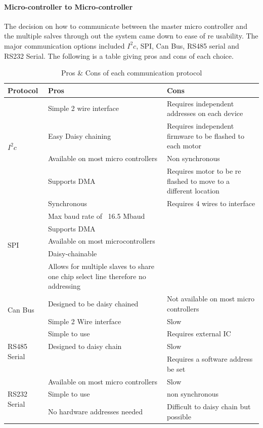             \paragraph{Micro-controller to Micro-controller}
            The decision on how to communicate between the master micro controller and the multiple salves through out the system came down to ease of re usability. The major communication options included ${I^2c}$, SPI, Can Bus, RS485 serial and RS232 Serial. The following is a table giving pros and cons of each choice.
        \begin{table}[H]
            \centering
            \begin{tabular}{|p{2cm}|p{6cm}|p{6cm}|}
        \hline
        Protocol   & Pros & Cons \\
        \hline
            \multirow{4}{*}{${I^2c}$} & Simple 2 wire interface & Requires independent addresses on each device \\
            & Easy Daisy chaining & Requires independent firmware to be flashed to each motor \\
            & Available on most micro controllers & Non synchronous \\
            & Supports DMA & Requires motor to be re flashed to move to a different location \\
            \hline
            \multirow{6}{*}{SPI} & Synchronous & Requires 4 wires to interface \\
            & Max baud rate of ~16.5 Mbaud &   \\
            & Supports DMA &  \\
            & Available on most microcontrollers & \\
            & Daisy-chainable & \\
            & Allows for multiple slaves to share one chip select line therefore no addressing & \\
            \hline
            \multirow{2}{*}{Can Bus} & Designed to be daisy chained  & Not available on most micro controllers \\
            & Simple 2 Wire interface & Slow  \\
            \hline
            \multirow{3}{*}{RS485 Serial}& Simple to use & Requires external IC\\
            &Designed to daisy chain & Slow \\
            & & Requires a software address be set\\
            \hline
            \multirow{3}{*}{RS232 Serial}& Available on most micro controllers & Slow\\
            & Simple to use & non synchronous \\
            & No hardware addresses needed & Difficult to daisy chain but possible\\
            
        \hline
        \end{tabular}
            \caption{Pros \& Cons of each communication protocol}
            \label{tab:ProsConsCommunicationProtocols}
        \end{table}
